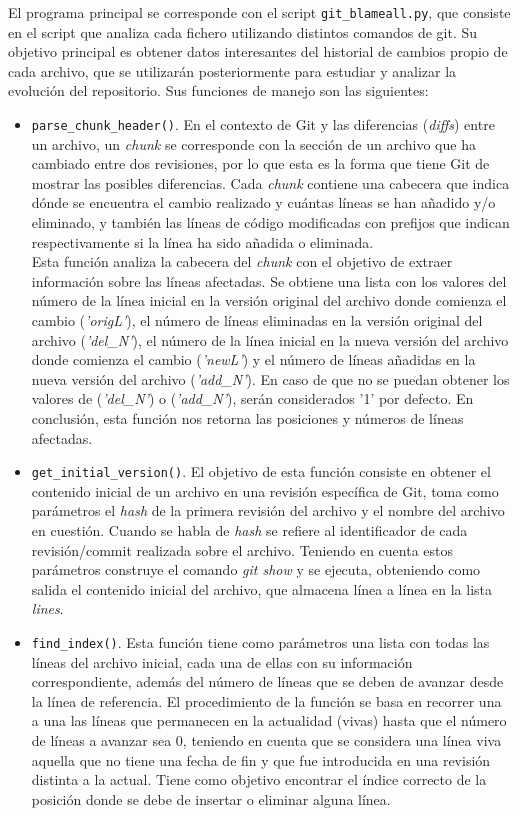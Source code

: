 \documentclass[a4paper, 12pt]{book}
\begin{document}
El programa principal se corresponde con el script \texttt{git\_blameall.py}, que consiste en el script que analiza cada fichero utilizando distintos comandos de git. Su objetivo principal es obtener datos interesantes del historial de cambios propio de cada archivo, que se utilizarán posteriormente para estudiar y 
analizar la evolución del repositorio. Sus funciones de manejo son las siguientes:
\begin{itemize}
  \item \texttt{parse\_chunk\_header()}. En el contexto de Git y las diferencias (\textit{diffs}) entre un archivo, un \textit{chunk} se corresponde con la sección de un archivo que ha cambiado entre dos revisiones, por lo que esta es la forma que tiene Git de mostrar las posibles diferencias. Cada \textit{chunk} 
  contiene una cabecera que indica dónde se encuentra el cambio realizado y cuántas líneas se han añadido y/o eliminado, y también las líneas de código modificadas con prefijos que indican respectivamente si la línea ha sido añadida o eliminada.
  \\Esta función analiza la cabecera del \textit{chunk} con el objetivo de extraer información sobre las líneas afectadas. Se obtiene una lista con los valores del número de la línea inicial en la versión original del archivo donde comienza el cambio (\textit{'origL'}), el número de líneas eliminadas en la versión original
  del archivo (\textit{'del\_N'}), el número de la línea inicial en la nueva versión del archivo donde comienza el cambio (\textit{'newL'}) y el número de líneas añadidas en la nueva versión del archivo (\textit{'add\_N'}). En caso de que no se puedan obtener los valores de (\textit{'del\_N'}) o (\textit{'add\_N'}), serán
  considerados '1' por defecto. En conclusión, esta función nos retorna las posiciones y números de líneas afectadas.
  
  \item \texttt{get\_initial\_version()}. El objetivo de esta función consiste en obtener el contenido inicial de un archivo en una revisión específica de Git, toma como parámetros el \textit{hash} de la primera revisión del archivo y el nombre del archivo en cuestión. Cuando se habla de \textit{hash} se refiere al identificador
  de cada revisión/commit realizada sobre el archivo. Teniendo en cuenta estos parámetros construye el comando \textit{git show} y se ejecuta, obteniendo como salida el contenido inicial del archivo, que almacena línea a línea en la lista \textit{lines}.

  \item \texttt{find\_index()}. Esta función tiene como parámetros una lista con todas las líneas del archivo inicial, cada una de ellas con su información correspondiente, además del número de líneas que se deben de avanzar desde la línea de referencia. El procedimiento de la función se basa en recorrer una a una las líneas que
  permanecen en la actualidad (vivas) hasta que el número de líneas a avanzar sea 0, teniendo en cuenta que se considera una línea viva aquella que no tiene una fecha de fin y que fue introducida en una revisión distinta a la actual. Tiene como objetivo encontrar el índice correcto de la posición donde se debe de insertar o eliminar
  alguna línea.
    

\end{itemize}
\end{document}

